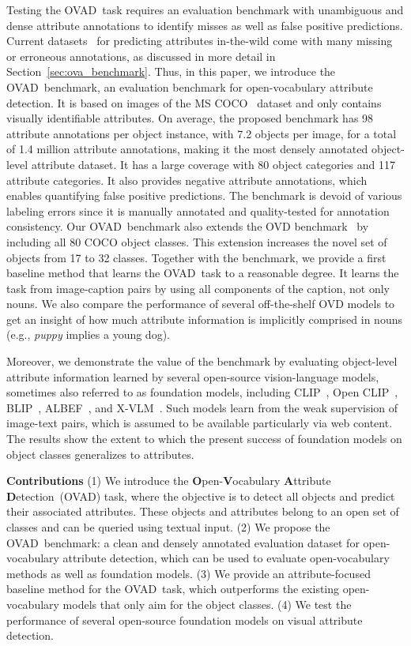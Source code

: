 \documentclass[10pt,twocolumn,letterpaper]{article}
\newcommand{\datasetname}{OVAD}
\newcommand{\taskname}{OVAD}
\begin{document}
Testing the \taskname\ task requires an evaluation benchmark with unambiguous and dense attribute annotations to identify misses as well as false positive predictions.
Current datasets~\cite{coco_attributes, vaw} for predicting attributes in-the-wild 
come with many missing or erroneous annotations, as discussed in more detail in Section~\ref{sec:ova_benchmark}.
Thus, in this paper, we introduce the \datasetname\ benchmark, an evaluation benchmark for open-vocabulary attribute detection. It is based on images of the MS COCO~\cite{coco} dataset and only contains visually identifiable attributes.
On average, the proposed benchmark has 98 attribute annotations per object instance, with 7.2 objects per image, for a total of 1.4 million attribute annotations, making it the most densely annotated object-level attribute dataset. 
It has a large coverage with 80 object categories and 117 attribute categories. 
It also provides negative attribute annotations, which enables quantifying false positive predictions.
The benchmark is devoid of various labeling errors since it is manually annotated and quality-tested for annotation consistency. 
Our \datasetname\ benchmark also extends the OVD benchmark~\cite{ovr_baseline} by including all 80 COCO object classes. This extension increases the novel set of objects from 17 to 32 classes. 
Together with the benchmark, we provide a first baseline method that learns the \taskname\ task to a reasonable degree. It learns the task from image-caption pairs by using all components of the caption, not only nouns. 
We also compare the performance of several off-the-shelf OVD models to get an insight of how much attribute information is implicitly comprised in nouns (e.g., \emph{puppy} implies a young dog).

Moreover, we demonstrate the value of the benchmark by evaluating object-level attribute information learned by several open-source vision-language models, sometimes also referred to as foundation models, including CLIP~\cite{clip}, Open CLIP~\cite{open_clip}, BLIP~\cite{blip}, ALBEF~\cite{albef}, and X-VLM~\cite{xvlm}. Such models learn from the weak supervision of image-text pairs, which is assumed to be available particularly via web content. The results show the extent to which the present success of foundation models on object classes generalizes to attributes.


\textbf{Contributions}
(1) We introduce the \textbf{O}pen-\textbf{V}ocabulary \textbf{A}ttribute \textbf{D}etection~(\taskname) task, 
where the objective is to detect all objects and predict their associated attributes. These objects and attributes belong to an open set of classes and can be queried using textual input.
(2) We propose the \datasetname\ benchmark: a clean and densely annotated evaluation dataset for open-vocabulary attribute detection, which can be used to evaluate open-vocabulary methods as well as foundation models.
(3) We provide an attribute-focused baseline method for the \taskname\ task, which outperforms the existing open-vocabulary models that only aim for the object classes.
(4) We test the performance of several open-source foundation models on visual attribute detection.
 
\end{document}

